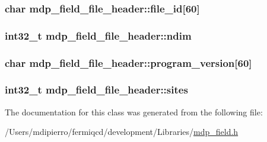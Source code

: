 \label{classmdp__field__file__header_aabc93969ba727e3e368608e21767a8d1}
\hypertarget{classmdp__field__file__header_ab1b8a05b7908871a5cedff9e0bfc33fa}{
\subsubsection[{file\_\-id}]{\setlength{\rightskip}{0pt plus 5cm}char {\bf mdp\_\-field\_\-file\_\-header::file\_\-id}\mbox{[}60\mbox{]}}}
\label{classmdp__field__file__header_ab1b8a05b7908871a5cedff9e0bfc33fa}
\hypertarget{classmdp__field__file__header_a530fb61672665d9fc563d5c25c14aafb}{
\subsubsection[{ndim}]{\setlength{\rightskip}{0pt plus 5cm}int32\_\-t {\bf mdp\_\-field\_\-file\_\-header::ndim}}}
\label{classmdp__field__file__header_a530fb61672665d9fc563d5c25c14aafb}
\hypertarget{classmdp__field__file__header_abb1bd41d1e209241fb85b0996fed9765}{
\subsubsection[{program\_\-version}]{\setlength{\rightskip}{0pt plus 5cm}char {\bf mdp\_\-field\_\-file\_\-header::program\_\-version}\mbox{[}60\mbox{]}}}
\label{classmdp__field__file__header_abb1bd41d1e209241fb85b0996fed9765}
\hypertarget{classmdp__field__file__header_a428a51466f48e613f85f9f9875a726bc}{
\subsubsection[{sites}]{\setlength{\rightskip}{0pt plus 5cm}int32\_\-t {\bf mdp\_\-field\_\-file\_\-header::sites}}}
\label{classmdp__field__file__header_a428a51466f48e613f85f9f9875a726bc}


The documentation for this class was generated from the following file:\begin{DoxyCompactItemize}
\item 
/Users/mdipierro/fermiqcd/development/Libraries/\hyperlink{mdp__field_8h}{mdp\_\-field.h}\end{DoxyCompactItemize}
